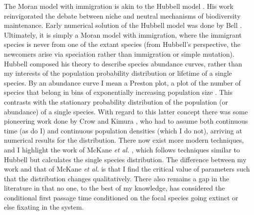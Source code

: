 The Moran model with immigration is akin to the Hubbell model \cite{Hubbell2001}. %
His work reinvigorated the debate between niche and neutral mechanisms of biodiversity maintenance. 
Early numerical solution of the Hubbell model was done by Bell \cite{Bell2001}. %
Ultimately, it is simply a Moran model with immigration, where the immigrant species is never from one of the extant species (from Hubbell's perspective, the newcomers arise via speciation rather than immigration or simple mutation). 
Hubbell composed his theory to describe species abundance curves, rather than my interests of the population probability distribution or lifetime of a single species. 
By an abundance curve I mean a Preston plot, a plot of the number of species that belong in bins of exponentially increasing population size \cite{Hubbell2001}. 
This contrasts with the stationary probability distribution of the population (or abundance) of a single species. 
With regard to this latter concept there was some pioneering work done by Crow and Kimura \cite{Crow1956,Kimura1983}, who had to assume both continuous time (as do I) and continuous population densities (which I do not), arriving at numerical results for the distribution. 
There now exist more modern techniques, and I highlight the work of McKane \emph{et al.} \cite{McKane2003}, which follows techniques similar to Hubbell but calculates the single species distribution. %
The difference between my work and that of McKane \emph{et al.} is that I find the critical value of parameters such that the distribution changes qualitatively. 
There also remains a gap in the literature in that no one, to the best of my knowledge, has considered the conditional first passage time conditioned on the focal species going extinct or else fixating in the system. 

